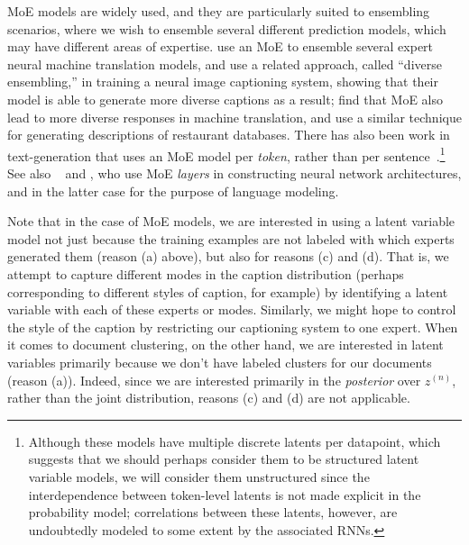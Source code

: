 \documentclass{article}
\begin{document}
MoE models are widely used, and they are particularly suited to ensembling scenarios, where we wish to ensemble several different prediction models, which may have different areas of expertise. \citet{garmash2016ensemble} use an MoE to ensemble several expert neural machine translation models, and \citet{lee2016stochastic} use a related approach, called ``diverse ensembling,'' in training a neural image captioning system, showing that their model is able to generate more diverse captions as a result; \citet{he2018moe} find that MoE also lead to more diverse responses in machine translation, and \citet{gehrmann2018end} use a similar technique for generating descriptions of restaurant databases. There has also been work in text-generation that uses an MoE model per \textit{token}, rather than per sentence~\citep{yin2016neural,le2016lstm,yang2018breaking}.\footnote{Although these models have multiple discrete latents per datapoint, which suggests that we should perhaps consider them to be structured latent variable models, we will consider them unstructured since the interdependence between token-level latents is not made explicit in the probability model; correlations between these latents, however, are undoubtedly modeled to some extent by the associated RNNs.} See also ~\citet{eigen2013learning} and \citet{shazeer2017outrageously}, who use MoE \textit{layers} in constructing neural network architectures, and in the latter case for the purpose of language modeling.

Note that in the case of MoE models, we are interested in using a latent variable model not just because the training examples are not labeled with which experts generated them (reason (a) above), but also for reasons (c) and (d). That is, we attempt to capture different modes in the caption distribution (perhaps corresponding to different styles of caption, for example) by identifying a latent variable with each of these experts or modes. Similarly, we might hope to control the style of the caption by restricting our captioning system to one expert. When it comes to document clustering, on the other hand, we are interested in latent variables primarily because we don't have labeled clusters for our documents (reason (a)). Indeed, since we are interested primarily in the \textit{posterior} over $z^{(n)}$, rather than the joint distribution, reasons (c) and (d) are not applicable.

\end{document}
